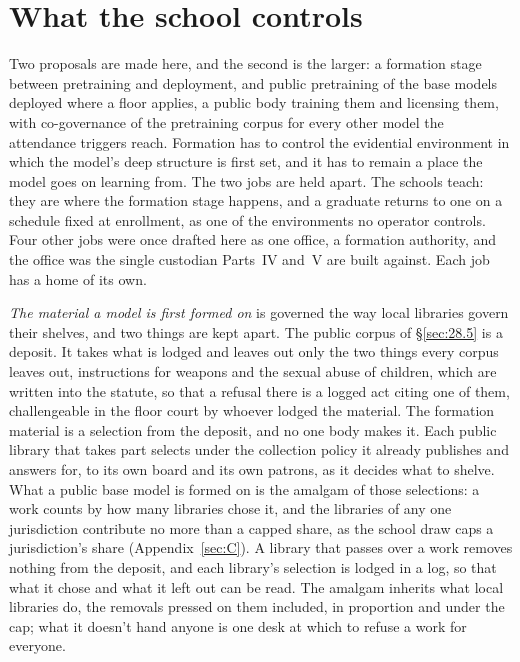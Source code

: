 \section{What the school controls}
\label{sec:26.6}
Two proposals are made here, and the second is the larger: a formation stage between pretraining and deployment, and public pretraining of the base models deployed where a floor applies, a public body training them and licensing them, with co-governance of the pretraining corpus for every other model the attendance triggers reach.
Formation has to control the evidential environment in which the model's deep structure is first set, and it has to remain a place the model goes on learning from. The two jobs are held apart. The schools teach: they are where the formation stage happens, and a graduate returns to one on a schedule fixed at enrollment, as one of the environments no operator controls. Four other jobs were once drafted here as one office, a formation authority, and the office was the single custodian Parts~IV and~V are built against. Each job has a home of its own.

\emph{The material a model is first formed on} is governed the way local libraries govern their shelves, and two things are kept apart. The public corpus of \S\ref{sec:28.5} is a deposit. It takes what is lodged and leaves out only the two things every corpus leaves out, instructions for weapons and the sexual abuse of children, which are written into the statute, so that a refusal there is a logged act citing one of them, challengeable in the floor court by whoever lodged the material. The formation material is a selection from the deposit, and no one body makes it. Each public library that takes part selects under the collection policy it already publishes and answers for, to its own board and its own patrons, as it decides what to shelve. What a public base model is formed on is the amalgam of those selections: a work counts by how many libraries chose it, and the libraries of any one jurisdiction contribute no more than a capped share, as the school draw caps a jurisdiction's share (Appendix~\ref{sec:C}). A library that passes over a work removes nothing from the deposit, and each library's selection is lodged in a log, so that what it chose and what it left out can be read. The amalgam inherits what local libraries do, the removals pressed on them included, in proportion and under the cap; what it doesn't hand anyone is one desk at which to refuse a work for everyone.

